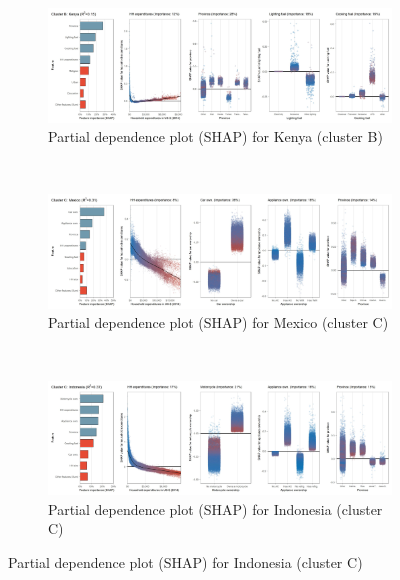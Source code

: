 \begin{figure}[ht!]\ContinuedFloat
    \centering
   \begin{subfigure}[b]{\textwidth}
         \centering
         \caption{Partial dependence plot (SHAP) for Kenya (cluster B)}
         \label{fig:5b_KEN}
         \includegraphics[width=\textwidth]{Figure 5b/Figure_5b_KEN}         
     \end{subfigure}
    \\
    \vspace{0.5cm}
   \begin{subfigure}[b]{\textwidth}
         \centering
         \caption{Partial dependence plot (SHAP) for Mexico (cluster C)}
         \label{fig:5b_MEX}
         \includegraphics[width=\textwidth]{Figure 5b/Figure_5b_MEX}         
     \end{subfigure}
    \\
    \vspace{0.5cm}
   \begin{subfigure}[b]{\textwidth}
         \centering
         \caption{Partial dependence plot (SHAP) for Indonesia (cluster C)}
         \label{fig:5b_IDN}
         \includegraphics[width=\textwidth]{Figure 5b/Figure_5b_IDN}

\end{subfigure}
\end{figure}
